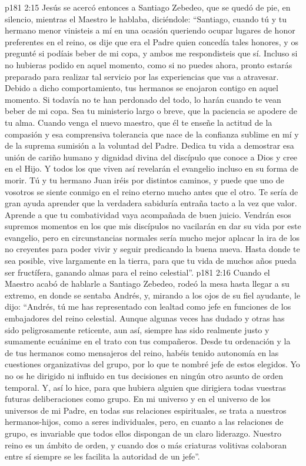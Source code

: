 \vs p181 2:15 \pc Jesús se acercó entonces a Santiago Zebedeo, que se quedó de pie, en silencio, mientras el Maestro le hablaba, diciéndole: “Santiago, cuando tú y tu hermano menor vinisteis a mí en una ocasión queriendo ocupar lugares de honor preferentes en el reino, os dije que era el Padre quien concedía tales honores, y os pregunté si podíais beber de mi copa, y ambos me respondisteis que sí. Incluso si no hubieras podido en aquel momento, como si no puedes ahora, pronto estarás preparado para realizar tal servicio por las experiencias que vas a atravesar. Debido a dicho comportamiento, tus hermanos se enojaron contigo en aquel momento. Si todavía no te han perdonado del todo, lo harán cuando te vean beber de mi copa. Sea tu ministerio largo o breve, que la paciencia se apodere de tu alma. Cuando venga el nuevo maestro, que él te enseñe la actitud de la compasión y esa comprensiva tolerancia que nace de la confianza sublime en mí y de la suprema sumisión a la voluntad del Padre. Dedica tu vida a demostrar esa unión de cariño humano y dignidad divina del discípulo que conoce a Dios y cree en el Hijo. Y todos los que viven así revelarán el evangelio incluso en su forma de morir. Tú y tu hermano Juan iréis por distintos caminos, y puede que uno de vosotros se siente conmigo en el reino eterno mucho antes que el otro. Te sería de gran ayuda aprender que la verdadera sabiduría entraña tacto a la vez que valor. Aprende a que tu combatividad vaya acompañada de buen juicio. Vendrán esos supremos momentos en los que mis discípulos no vacilarán en dar su vida por este evangelio, pero en circunstancias normales sería mucho mejor aplacar la ira de los no creyentes para poder vivir y seguir predicando la buena nueva. Hasta donde te sea posible, vive largamente en la tierra, para que tu vida de muchos años pueda ser fructífera, ganando almas para el reino celestial”.
\vs p181 2:16 \pc Cuando el Maestro acabó de hablarle a Santiago Zebedeo, rodeó la mesa hasta llegar a su extremo, en donde se sentaba Andrés, y, mirando a los ojos de su fiel ayudante, le dijo: “Andrés, tú me has representado con lealtad como jefe en funciones de los embajadores del reino celestial. Aunque algunas veces has dudado y otras has sido peligrosamente reticente, aun así, siempre has sido realmente justo y sumamente ecuánime en el trato con tus compañeros. Desde tu ordenación y la de tus hermanos como mensajeros del reino, habéis tenido autonomía en las cuestiones organizativas del grupo, por lo que te nombré jefe de estos elegidos. Yo no os he dirigido ni influido en tus decisiones en ningún otro asunto de orden temporal. Y, así lo hice, para que hubiera alguien que dirigiera todas vuestras futuras deliberaciones como grupo. En mi universo y en el universo de los universos de mi Padre, en todas sus relaciones espirituales, se trata a nuestros hermanos\hyp{}hijos, como a seres individuales, pero, en cuanto a las relaciones de grupo, es invariable que todos ellos dispongan de un claro liderazgo. Nuestro reino es un ámbito de orden, y cuando dos o más criaturas volitivas colaboran entre sí siempre se les facilita la autoridad de un jefe”.

